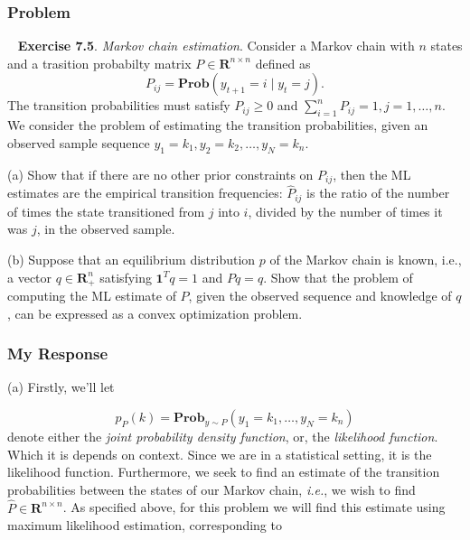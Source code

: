 \documentclass[12pt,reqno]{article}
\theoremstyle{definition}
\numberwithin{equation}{section}
\begin{document}
\subsubsection*{Problem}
~\cite{boyd_convex_optimization} \textbf{Exercise 7.5}. \textit{Markov chain estimation}. Consider a Markov chain
with $n$ states and a trasition probabilty matrix $P \in \mathbf{R}^{n \times n}$ defined as
\[P_{ij} = \mathbf{Prob}\left(y_{t+1} = i \mid y_t = j\right).\]
The transition probabilities must satisfy $P_{i j} \geq 0$ and $\sum_{i=1}^n P_{i j}=1, j=1, \ldots, n$. We consider the problem of estimating the transition probabilities,
given an observed sample sequence $y_1=k_1, y_2=k_2, \ldots, y_N=k_n$.

\vspace{0.1cm}
\noindent (a) Show that if there are no other prior constraints on $P_{i j}$, then the ML estimates are the empirical transition frequencies:
$\hat{P}_{i j}$ is the ratio of the number of times the state transitioned from $j$ into $i$, divided by the number of times it was $j$, in the observed sample.

\vspace{0.1cm}
\noindent (b) Suppose that an equilibrium distribution $p$ of the Markov chain is known, i.e., a vector $q \in \mathbf{R}_{+}^n$ satisfying $\mathbf{1}^T q=1$ and $P q=q$. Show that the problem of computing the ML estimate of $P$,
given the observed sequence and knowledge of $q$, can be expressed as a convex optimization problem.

\subsubsection*{My Response}
\noindent (a) Firstly, we'll let

\[p_{P}(k) = \mathbf{Prob}_{y \sim P}\left(y_1 = k_1, \ldots, y_N = k_n\right)\]
denote either the \textit{joint probability density function}, or,
the \textit{likelihood function}. Which it is depends on context.
Since we are in a statistical setting, it is the likelihood function. Furthermore, we seek to find an estimate
of the transition probabilities between the states of our Markov chain, \textit{i.e.}, we wish to find $\hat{P} \in \mathbf{R}^{n \times n}$.
As specified above, for this problem we will find this estimate using maximum likelihood estimation, corresponding to 
\end{document}
